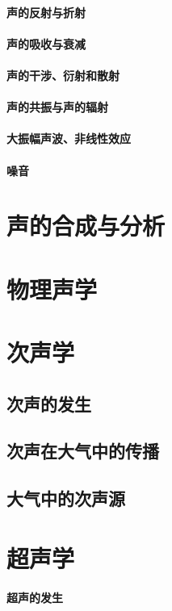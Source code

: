 \documentclass[UTF8]{../06-Physics}
\begin{document}
    \subsubsection{声的反射与折射}
    \subsubsection{声的吸收与衰减}
    \subsubsection{声的干涉、衍射和散射}
    \subsubsection{声的共振与声的辐射}
    \subsubsection{大振幅声波、非线性效应}
    \subsubsection{噪音}


\chapter{声的合成与分析}
\chapter{物理声学}
\chapter{次声学}
    \section{次声的发生}
    \section{次声在大气中的传播}
    \section{大气中的次声源}




\chapter{超声学}
    \subsubsection{超声的发生}
\end{document}

